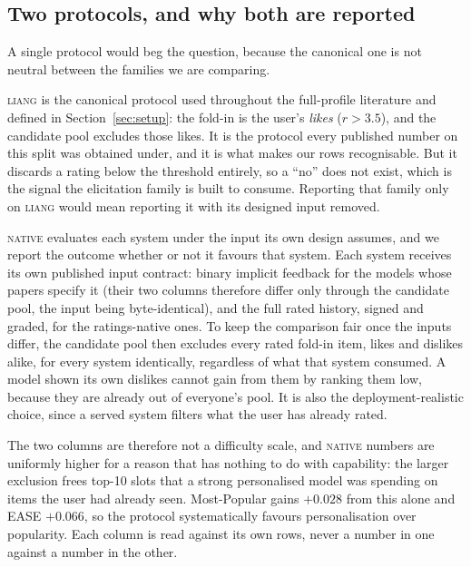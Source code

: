 \documentclass[manuscript,screen,review]{acmart}
\begin{document}
\subsection{Two protocols, and why both are reported}\label{sec:protocols}
A single protocol would beg the question, because the canonical one is not neutral between the families we are comparing.

\textsc{liang} is the canonical protocol used throughout the full-profile literature and defined in Section~\ref{sec:setup}: the fold-in is the user's \emph{likes} ($r>3.5$), and the candidate pool excludes those likes. It is the protocol every published number on this split was obtained under, and it is what makes our rows recognisable. But it discards a rating below the threshold entirely, so a ``no'' does not exist, which is the signal the elicitation family is built to consume. Reporting that family only on \textsc{liang} would mean reporting it with its designed input removed.

\textsc{native} evaluates each system under the input its own design assumes, and we report the outcome whether or not it favours that system. Each system receives its own published input contract: binary implicit feedback for the models whose papers specify it (their two columns therefore differ only through the candidate pool, the input being byte-identical), and the full rated history, signed and graded, for the ratings-native ones. To keep the comparison fair once the inputs differ, the candidate pool then excludes every rated fold-in item, likes and dislikes alike, for every system identically, regardless of what that system consumed. A model shown its own dislikes cannot gain from them by ranking them low, because they are already out of everyone's pool. It is also the deployment-realistic choice, since a served system filters what the user has already rated.

The two columns are therefore not a difficulty scale, and \textsc{native} numbers are uniformly higher for a reason that has nothing to do with capability: the larger exclusion frees top-10 slots that a strong personalised model was spending on items the user had already seen. Most-Popular gains $+0.028$ from this alone and EASE $+0.066$, so the protocol systematically favours personalisation over popularity. Each column is read against its own rows, never a number in one against a number in the other.
\end{document}
